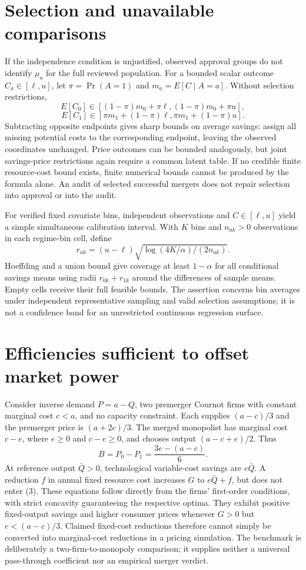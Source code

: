 \documentclass[11pt,a4paper]{article}
\begin{document}
\section{Selection and unavailable comparisons}
If the independence condition is unjustified, observed approval groups do not identify $\mu_a$ for the full reviewed population. For a bounded scalar outcome $C_a\in[\ell,u]$, let $\pi=\Pr(A=1)$ and $m_a=E[C\mid A=a]$. Without selection restrictions,
\[
 E[C_0]\in[(1-\pi)m_0+\pi\ell,(1-\pi)m_0+\pi u],
\]
\[
 E[C_1]\in[\pi m_1+(1-\pi)\ell,\pi m_1+(1-\pi)u].
\]
Subtracting opposite endpoints gives sharp bounds on average savings: assign all missing potential costs to the corresponding endpoint, leaving the observed coordinates unchanged. Price outcomes can be bounded analogously, but joint savings-price restrictions again require a common latent table. If no credible finite resource-cost bound exists, finite numerical bounds cannot be produced by the formula alone. An audit of selected successful mergers does not repair selection into approval or into the audit.

For verified fixed covariate bins, independent observations and $C\in[\ell,u]$ yield a simple simultaneous calibration interval. With $K$ bins and $n_{ak}>0$ observations in each regime-bin cell, define
\[
 r_{ak}=(u-\ell)\sqrt{\log(4K/\alpha)/(2n_{ak})}.
\]
Hoeffding and a union bound give coverage at least $1-\alpha$ for all conditional savings means using radii $r_{0k}+r_{1k}$ around the differences of sample means. Empty cells receive their full feasible bounds. The assertion concerns bin averages under independent representative sampling and valid selection assumptions; it is not a confidence band for an unrestricted continuous regression surface.

\section{Efficiencies sufficient to offset market power}
Consider inverse demand $P=a-Q$, two premerger Cournot firms with constant marginal cost $c<a$, and no capacity constraint. Each supplies $(a-c)/3$ and the premerger price is $(a+2c)/3$. The merged monopolist has marginal cost $c-e$, where $e\ge0$ and $c-e\ge0$, and chooses output $(a-c+e)/2$. Thus
\[
 B=P_0-P_1=\frac{3e-(a-c)}6. \tag{3}
\]
At reference output $\bar Q>0$, technological variable-cost savings are $e\bar Q$. A reduction $f$ in annual fixed resource cost increases $G$ to $e\bar Q+f$, but does not enter (3). These equations follow directly from the firms' first-order conditions, with strict concavity guaranteeing the respective optima. They exhibit positive fixed-output savings and higher consumer prices whenever $G>0$ but $e<(a-c)/3$. Claimed fixed-cost reductions therefore cannot simply be converted into marginal-cost reductions in a pricing simulation. The benchmark is deliberately a two-firm-to-monopoly comparison; it supplies neither a universal pass-through coefficient nor an empirical merger verdict.
\end{document}
